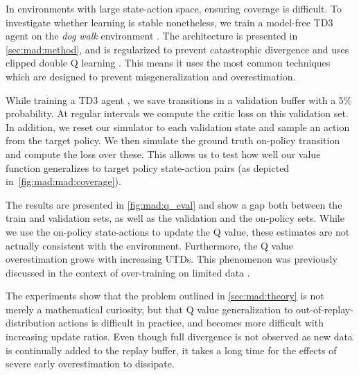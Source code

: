 In environments with large state-action space, ensuring coverage is difficult.
To investigate whether learning is stable nonetheless, we train a model-free TD3 agent on the \emph{dog walk} environment \parencite{tunyasuvunakool2020}.
The architecture is presented in \autoref{sec:mad:method}, and is regularized to prevent catastrophic divergence \parencite{hussing2024dissecting,nauman2024overestimation} and uses clipped double Q learning \parencite{fujimoto2018addressing}.
This means it uses the most common techniques which are designed to prevent misgeneralization and overestimation.

While training a TD3 agent \parencite{fujimoto2018addressing}, we save transitions in a validation buffer with a 5\% probability.
At regular intervals we compute the critic loss on this validation set.
In addition, we reset our simulator to each validation state and sample an action from the target policy.
We then simulate the ground truth on-policy transition and compute the loss over these.
This allows us to test how well our value function generalizes to target policy state-action pairs (as depicted in~\autoref{fig:mad:mad:coverage}).

The results are presented in \autoref{fig:mad:q_eval} and show a gap both between the train and validation sets, as well as the validation and the on-policy sets.
While we use the on-policy state-actions to update the Q value, these estimates are not actually consistent with the environment.
Furthermore, the Q value overestimation grows with increasing UTDs.
This phenomenon was previously discussed in the context of over-training on limited data \parencite{hussing2024dissecting} .

The experiments show that the problem outlined in \autoref{sec:mad:theory} is not merely a mathematical curiosity, but that Q value generalization to out-of-replay-distribution actions is difficult in practice, and becomes more difficult with increasing update ratios.
Even though full divergence is not observed as new data is continually added to the replay buffer, it takes a long time for the effects of severe early overestimation to dissipate.

